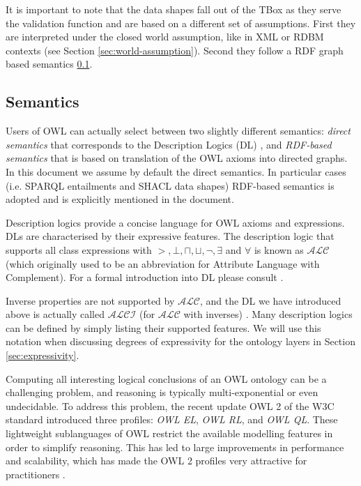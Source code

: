 	It is important to note that the data shapes fall out of the TBox as they serve the validation function and are based on a different set of assumptions. First they are interpreted under the closed world assumption, like in XML  or RDBM contexts (see Section \ref{sec:world-assumption}). Second they follow a RDF graph based semantics \ref{sec:semantics}.

	\subsection{Semantics}
	\label{sec:semantics}
	
	Users of OWL \citep{owl2} can actually select between two slightly different semantics: \textit{direct semantics} that corresponds to the Description Logics (DL) \cite{dl-baader2004description}, and \textit{RDF-based semantics} that is based on translation of the OWL axioms into directed graphs. In this document we assume by default the direct semantics. In particular cases (i.e. SPARQL entailments and SHACL data shapes) RDF-based semantics is adopted and is explicitly mentioned in the document. 
	
	Description logics provide a concise language for OWL axioms and expressions. DLs are characterised by their expressive features. The description logic that supports all class expressions with $>, \bot, \sqcap, \sqcup, \neg, \exists$ and $\forall$ is known as $\mathcal{ALC}$ (which originally used to be an abbreviation for Attribute Language with Complement). For a formal introduction into DL please consult \citet{dl-baader2004description}.
	
	Inverse properties are not supported by $\mathcal{ALC}$, and the DL we have introduced above is actually called $\mathcal{ALCI}$ (for $\mathcal{ALC}$ with inverses) \cite{krotzsch2012owl}. Many description logics can be defined by simply listing their supported features. We will use this notation when discussing degrees of expressivity for the ontology layers in Section \ref{sec:expressivity}.
	
	Computing all interesting logical conclusions of an OWL ontology can be a challenging problem, and reasoning is typically multi-exponential or even undecidable. To address this problem, the recent update OWL 2 of the W3C standard \citep{owl2.0,owl2} introduced three profiles: \textit{OWL EL}, \textit{OWL RL}, and \textit{OWL QL}. These lightweight sublanguages of OWL restrict the available modelling features in order to simplify reasoning. This has led to large improvements in performance and scalability, which has made the OWL 2 profiles very attractive for practitioners \citep{krotzsch2012owl}.
	
